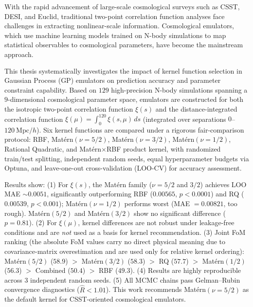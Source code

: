 \begin{abstract*}
  With the rapid advancement of large-scale cosmological surveys such as CSST, DESI,
  and Euclid, traditional two-point correlation function analyses face challenges in
  extracting nonlinear-scale information. Cosmological emulators, which use machine
  learning models trained on N-body simulations to map statistical observables to
  cosmological parameters, have become the mainstream approach.

  This thesis systematically investigates the impact of kernel function selection in
  Gaussian Process (GP) emulators on prediction accuracy and parameter constraint
  capability. Based on $129$ high-precision N-body simulations spanning a $9$-dimensional
  cosmological parameter space, emulators are constructed for both the isotropic
  two-point correlation function $\xi(s)$ and the distance-integrated correlation
  function $\xi(\mu)=\int_0^{120}\xi(s,\mu)\,ds$ (integrated over separations
  $0$--$120~\mathrm{Mpc}/h$). Six kernel functions are compared under a rigorous
  fair-comparison protocol: RBF, Mat\'ern$(\nu=5/2)$, Mat\'ern$(\nu=3/2)$,
  Mat\'ern$(\nu=1/2)$, Rational Quadratic, and Mat\'ern$\times$RBF product kernel,
  with randomized train/test splitting, independent random seeds, equal hyperparameter
  budgets via Optuna, and leave-one-out cross-validation (LOO-CV) for accuracy
  assessment.

  Results show: (1) For $\xi(s)$, the Mat\'ern family ($\nu=5/2$ and $3/2$) achieves
  LOO MAE ${\sim}0.0051$, significantly outperforming RBF ($0.00565$, $p<0.0001$) and
  RQ ($0.00539$, $p<0.001$); Mat\'ern$(\nu=1/2)$ performs worst (MAE ${}=0.00821$,
  too rough). Mat\'ern$(5/2)$ and Mat\'ern$(3/2)$ show no significant difference
  ($p=0.81$). (2) For $\xi(\mu)$, kernel differences are not robust under
  leakage-free conditions and are \emph{not} used as a basis for kernel recommendation.
  (3) Joint FoM ranking (the absolute FoM values carry no direct physical meaning due
  to covariance-matrix overestimation and are used only for relative kernel ordering):
  Mat\'ern$(5/2)$ ($58.9$) ${}>{}$ Mat\'ern$(3/2)$ ($58.3$) ${}>{}$ RQ ($57.7$) ${}>{}$
  Mat\'ern$(1/2)$ ($56.3$) ${}>{}$ Combined ($50.4$) ${}>{}$ RBF ($49.3$).
  (4) Results are highly reproducible
  across $3$ independent random seeds. (5) All MCMC chains pass Gelman--Rubin
  convergence diagnostics ($\hat R<1.01$). This work recommends Mat\'ern$(\nu=5/2)$
  as the default kernel for CSST-oriented cosmological emulators.
\end{abstract*}

